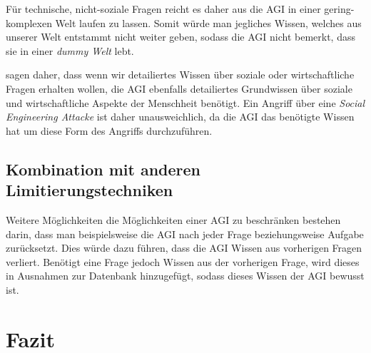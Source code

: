         Für technische, nicht-soziale Fragen reicht es daher aus die AGI in einer gering-komplexen Welt laufen zu lassen.
        \cite[p. 310]{armstrongforthcoming} Somit würde man jegliches Wissen, welches aus unserer Welt entstammt nicht
        weiter geben, sodass die AGI nicht bemerkt, dass sie in einer \textit{dummy Welt} lebt.

        \citealp{armstrongforthcoming} sagen daher, dass wenn wir detailiertes Wissen über soziale oder wirtschaftliche
        Fragen erhalten wollen, die AGI ebenfalls detailiertes Grundwissen über soziale und wirtschaftliche Aspekte der
        Menschheit benötigt. Ein Angriff über eine \textit{Social Engineering Attacke} ist daher unausweichlich, da die
        AGI das benötigte Wissen hat um diese Form des Angriffs durchzuführen.\cite[p. 310]{armstrongforthcoming}


        \subsection{Kombination mit anderen Limitierungstechniken}
        Weitere Möglichkeiten die Möglichkeiten einer AGI zu beschränken bestehen darin, dass man beispielsweise die
        AGI nach jeder Frage beziehungsweise Aufgabe zurücksetzt.\cite[p. 309]{armstrongforthcoming} Dies würde dazu
        führen, dass die AGI Wissen aus vorherigen Fragen verliert. Benötigt eine Frage jedoch Wissen aus der vorherigen
        Frage, wird dieses in Ausnahmen zur Datenbank hinzugefügt, sodass dieses Wissen der AGI bewusst ist.

    \section{Fazit}

    \newpage
    
    



